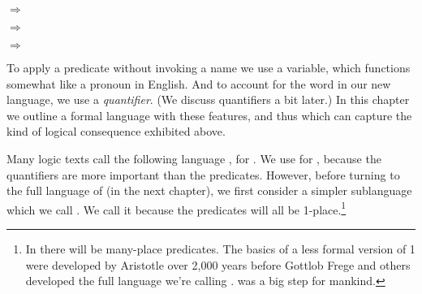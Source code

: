 \begin{menumerate}
	\item {} $\Rightarrow$ 
	\item {} $\Rightarrow$ 
	\item {} $\Rightarrow$ 	
\end{menumerate}

\noindent{}To apply a predicate without invoking a name we use a variable, which functions somewhat like a pronoun in English.  And to account for the word  in our new language, we use a \emph{quantifier}.  (We discuss quantifiers a bit later.)  In this chapter we outline a formal language with these features, and thus which can capture the kind of logical consequence exhibited above.

Many logic texts call the following language \PL{}, for . 
We use \mention{\QL{}} for , because the quantifiers are more important than the predicates. However, before turning to the full language of \GQL{} (in the next chapter), we first consider a simpler sublanguage which we call .  We call it  because the predicates will all be 1-place.\footnote{In \GQL{} there will be many-place predicates.  The basics of a less formal version of \GQL{}1 were developed by Aristotle over 2,000 years before Gottlob Frege and others developed the full language we're calling \GQL{}.  \GQL{} was a big step for mankind.}
 
